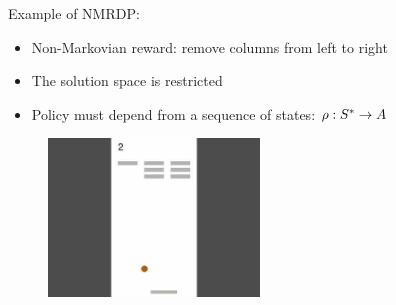 \documentclass{beamer}
\begin{document}





\begin{frame}{Example of NMRDP: \Breakout}
	\begin{itemize}
		\item Non-Markovian reward: remove columns from left to right
		\item The solution space is restricted
		\item Policy must depend from a sequence of states: $\rho: S^* \to A$
	\end{itemize}

	\begin{figure}
		\centering
		\includegraphics[width=0.5\textwidth]{images/breakout.jpg}
	\end{figure}
\end{frame}
\end{document}
